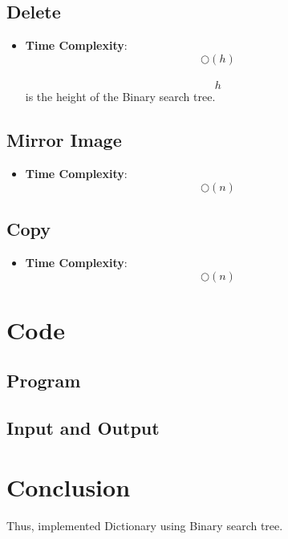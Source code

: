 \documentclass[11pt]{article}
\begin{document}
\subsection{Delete}
\begin{itemize}
	\item \textbf{Time Complexity}: \[\bigcirc(h)\]\\
	      \[h\] is the height of the Binary search tree.
\end{itemize}
\subsection{Mirror Image}
\begin{itemize}
	\item \textbf{Time Complexity}:\[\bigcirc(n)\]
\end{itemize}
\subsection{Copy}
\begin{itemize}
	\item \textbf{Time Complexity}:\[\bigcirc(n)\]
\end{itemize}

\section{Code}

\subsection{Program}


\subsection{Input and Output}


\section{Conclusion}
Thus, implemented Dictionary using Binary search tree.
\clearpage
\end{document}
